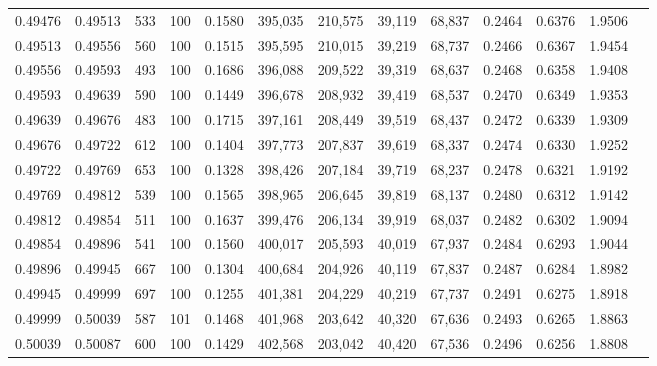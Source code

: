\begin{tabular}{rrrrrrrrrrrrr}
0.49476 & 0.49513 &   533 & 100 &                                     0.1580 & 395,035 & 210,575 &  39,119 &  68,837 & 0.2464 & 0.6376 & 1.9506 \\
0.49513 & 0.49556 &   560 & 100 &                                     0.1515 & 395,595 & 210,015 &  39,219 &  68,737 & 0.2466 & 0.6367 & 1.9454 \\
0.49556 & 0.49593 &   493 & 100 &                                     0.1686 & 396,088 & 209,522 &  39,319 &  68,637 & 0.2468 & 0.6358 & 1.9408 \\
0.49593 & 0.49639 &   590 & 100 &                                     0.1449 & 396,678 & 208,932 &  39,419 &  68,537 & 0.2470 & 0.6349 & 1.9353 \\
0.49639 & 0.49676 &   483 & 100 &                                     0.1715 & 397,161 & 208,449 &  39,519 &  68,437 & 0.2472 & 0.6339 & 1.9309 \\
0.49676 & 0.49722 &   612 & 100 &                                     0.1404 & 397,773 & 207,837 &  39,619 &  68,337 & 0.2474 & 0.6330 & 1.9252 \\
0.49722 & 0.49769 &   653 & 100 &                                     0.1328 & 398,426 & 207,184 &  39,719 &  68,237 & 0.2478 & 0.6321 & 1.9192 \\
0.49769 & 0.49812 &   539 & 100 &                                     0.1565 & 398,965 & 206,645 &  39,819 &  68,137 & 0.2480 & 0.6312 & 1.9142 \\
0.49812 & 0.49854 &   511 & 100 &                                     0.1637 & 399,476 & 206,134 &  39,919 &  68,037 & 0.2482 & 0.6302 & 1.9094 \\
0.49854 & 0.49896 &   541 & 100 &                                     0.1560 & 400,017 & 205,593 &  40,019 &  67,937 & 0.2484 & 0.6293 & 1.9044 \\
0.49896 & 0.49945 &   667 & 100 &                                     0.1304 & 400,684 & 204,926 &  40,119 &  67,837 & 0.2487 & 0.6284 & 1.8982 \\
0.49945 & 0.49999 &   697 & 100 &                                     0.1255 & 401,381 & 204,229 &  40,219 &  67,737 & 0.2491 & 0.6275 & 1.8918 \\
0.49999 & 0.50039 &   587 & 101 &                                     0.1468 & 401,968 & 203,642 &  40,320 &  67,636 & 0.2493 & 0.6265 & 1.8863 \\
0.50039 & 0.50087 &   600 & 100 &                                     0.1429 & 402,568 & 203,042 &  40,420 &  67,536 & 0.2496 & 0.6256 & 1.8808 \\

\end{tabular}
